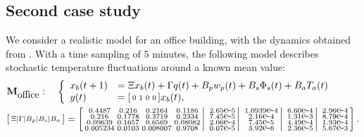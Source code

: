 \documentclass[letterpaper, 10 pt, conference]{amsart}
\theoremstyle{definition}
\theoremstyle{example}
\theoremstyle{remark}
\begin{document}
\subsection{Second case study} 
We consider a realistic model for an office building, with the dynamics obtained from \cite{Bacher2011}.
With a time sampling of $5$ minutes, 
the following model describes stochastic temperature fluctuations around a known mean value: 
\begin{align*}&\mathbf M_{\mbox{office}}:\quad\left\{\begin{array}{ll}
x_b(t+1)&=\Xi x_b(t)+ \Gamma q(t)+B_{p} w_p(t)+ B_s\Phi_s(t)+ B_a T_a(t)\\
y(t)&=\begin{bsmallmatrix}0&1&0&0\end{bsmallmatrix}x_b(t),\end{array}\right.\\
& \begin{bsmallmatrix*}\Xi\mid \Gamma\mid B_p  \mid    B_s\mid B_{a} \end{bsmallmatrix*}= \left[\begin{smallmatrix}  
    0.4487 &    0.216   & 0.2164&    0.1186\\
     0.216 &   0.1778  &  0.3719 &   0.2334\\
   0.09639 &   0.1657 &   0.6569  & 0.08082\\
 0.005234   & 0.0103 & 0.008007    &0.9708\end{smallmatrix}\right|\left.  
 \begin{smallmatrix}    2.65\mbox{e-}5\\
    7.45\mbox{e-}5\\
   2.06\mbox{e-}4\\
    0.07\mbox{e-}5\\
 \end{smallmatrix}\right|\left. 
 \begin{smallmatrix}     1.0939\mbox{e-}4\\
   2.16\mbox{e-}4\\
   7.45\mbox{e-}5\\
   3.92\mbox{e-}6   \end{smallmatrix}\right| \left.\begin{smallmatrix}    6.60\mbox{e-}4\\
   1.31\mbox{e-}3\\
   4.49\mbox{e-}4\\
   2.36\mbox{e-}5
   \end{smallmatrix}\right|\left.
\begin{smallmatrix}
   2.96\mbox{e-}4\\
   8.79\mbox{e-}4\\
   1.93\mbox{e-}4\\
   5.67\mbox{e-}3
 \end{smallmatrix}\right].\end{align*}
\end{document}
